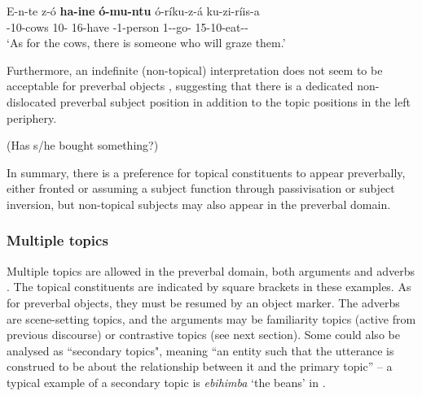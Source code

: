 \documentclass[output=paper]{langscibook}
\begin{document}
\ea
\label{bkm:Ref116291393}
\gll
E-n-te  z-ó  \textbf{ha-ine}  \textbf{ó-mu-ntu}  ó-ríku-z-á ku-zi-ríis-a \\
\AUG{}-10-cows  10-\CM{}  16\SM{}-{}have  \AUG{}-1-person  1\RM{}-\IPFV{}-{}go-\FV{} 15-{}10\OM{}-{}eat-\CAUS{}-\FV{} \\
\glt
‘As for the cows, there is someone who will graze them.’\\

\z


Furthermore, an indefinite (non-topical) interpretation does not seem to be acceptable for preverbal objects , suggesting that there is a dedicated non-dislocated preverbal subject position in addition to the topic positions in the left periphery.

\ea
\label{bkm:Ref111449315}
(Has s/he bought something?)\\

\z

In summary, there is a preference for topical constituents to appear preverbally, either fronted or assuming a subject function through passivisation or subject inversion, but non-topical subjects may also appear in the preverbal domain.

\subsubsection{Multiple topics}
\label{bkm:Ref127956542}
Multiple topics are allowed in the preverbal domain, both arguments  and adverbs . The topical constituents are indicated by square brackets in these examples. As for preverbal objects, they must be resumed by an object marker. The adverbs are scene-setting topics, and the arguments may be familiarity topics (active from previous discourse) or contrastive topics (see next section). Some could also be analysed as ``secondary topics", meaning “an entity such that the utterance is construed to be about the relationship between it and the primary topic” \citep{Nikolaeva2001} – a typical example of a secondary topic is \textit{ebihimba} ‘the beans’ in .
\end{document}
